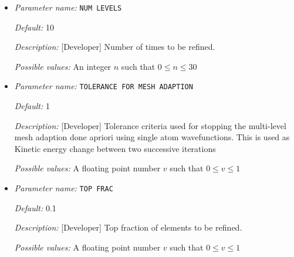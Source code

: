 \begin{itemize}


{\it Default:} 0.0


{\it Description:} [Advanced] Mesh size of the finite elements in the immediate vicinity of the atom. For the default value of 0.0, a heuristically determined MESH SIZE AT ATOM is used, which is good enough for most cases. Standard users do not need to tune this parameter. Units: a.u.


{\it Possible values:} A floating point number $v$ such that $0 \leq v \leq 10$
\item {\it Parameter name:} {\tt NUM LEVELS}
\label{parameters:Finite element mesh parameters/Auto mesh generation parameters/NUM LEVELS}
\label{parameters:Finite_20element_20mesh_20parameters/Auto_20mesh_20generation_20parameters/NUM_20LEVELS}




{\it Default:} 10


{\it Description:} [Developer] Number of times to be refined.


{\it Possible values:} An integer $n$ such that $0\leq n \leq 30$
\item {\it Parameter name:} {\tt TOLERANCE FOR MESH ADAPTION}
\label{parameters:Finite element mesh parameters/Auto mesh generation parameters/TOLERANCE FOR MESH ADAPTION}
\label{parameters:Finite_20element_20mesh_20parameters/Auto_20mesh_20generation_20parameters/TOLERANCE_20FOR_20MESH_20ADAPTION}




{\it Default:} 1


{\it Description:} [Developer] Tolerance criteria used for stopping the multi-level mesh adaption done apriori using single atom wavefunctions. This is used as Kinetic energy change between two successive iterations


{\it Possible values:} A floating point number $v$ such that $0 \leq v \leq 1$
\item {\it Parameter name:} {\tt TOP FRAC}
\label{parameters:Finite element mesh parameters/Auto mesh generation parameters/TOP FRAC}
\label{parameters:Finite_20element_20mesh_20parameters/Auto_20mesh_20generation_20parameters/TOP_20FRAC}




{\it Default:} 0.1


{\it Description:} [Developer] Top fraction of elements to be refined.


{\it Possible values:} A floating point number $v$ such that $0 \leq v \leq 1$
\end{itemize}

